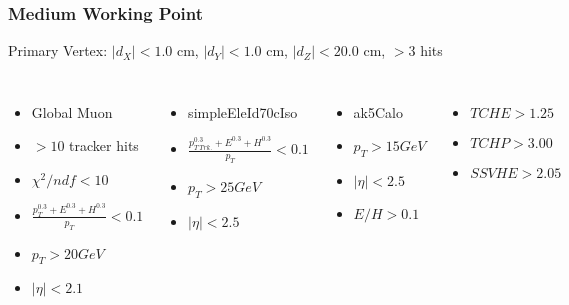 \documentclass{beamer}
\begin{document}
\begin{frame}
\frametitle{Medium Working Point}
Primary Vertex: $|d_X|<1.0$ cm, $|d_Y|<1.0$ cm, $|d_Z|<20.0$ cm, $>$3 hits
\begin{columns}[c]
\column{4cm}
\begin{itemize}
\item Global Muon
\item $>10$ tracker hits
\item $\chi^2/{ndf}<10$
\item $\frac{p_T^{0.3}+E^{0.3}+H^{0.3}}{p_T}<0.1$
\item $p_T>20GeV$
\item $|\eta|<2.1$
\end{itemize}
\column{4.5cm}
\begin{itemize}
\item simpleEleId70cIso
\item $\frac{p_{T\, Trk.}^{0.3}+E^{0.3}+H^{0.3}}{p_T}<0.1$
\item $p_T>25GeV$
\item $|\eta|<2.5$
\end{itemize}
\column{4cm}
\begin{itemize}
\item ak5Calo
\item$p_T>15 GeV$
\item $|\eta|<2.5$
\item $E/H>0.1$
\end{itemize}
\begin{itemize}
\item $TCHE>1.25$
\item $TCHP>3.00$
\item $SSVHE>2.05$
\end{itemize}
\end{columns}
\end{frame}
\end{document}
